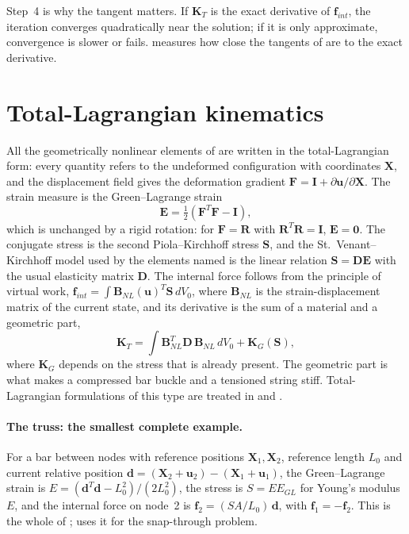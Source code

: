 
Step~4 is why the tangent matters. If $\bm K_T$ is the exact derivative of $\bm f_{int}$, the iteration converges quadratically near the solution; if it is only approximate, convergence is slower or fails.  measures how close the tangents of \fea{} are to the exact derivative.

\section{Total-Lagrangian kinematics}\label{sec:nl-tl}

All the geometrically nonlinear elements of \fea{} are written in the total-Lagrangian form: every quantity refers to the undeformed configuration with coordinates $\bm X$, and the displacement field gives the deformation gradient $\bm F=\bm I+\partial\bm u/\partial\bm X$. The strain measure is the Green--Lagrange strain
\begin{equation}\label{eq:nl-gl}
\bm E=\tfrac12\left(\bm F^{T}\bm F-\bm I\right),
\end{equation}
which is unchanged by a rigid rotation: for $\bm F=\bm R$ with $\bm R^T\bm R=\bm I$, $\bm E=\bm 0$. The conjugate stress is the second Piola--Kirchhoff stress $\bm S$, and the St.~Venant--Kirchhoff model used by the elements named  is the linear relation $\bm S=\bm D\bm E$ with the usual elasticity matrix $\bm D$. The internal force follows from the principle of virtual work, $\bm f_{int}=\int \bm B_{NL}(\bm u)^{T}\bm S\,dV_0$, where $\bm B_{NL}$ is the strain-displacement matrix of the current state, and its derivative is the sum of a material and a geometric part,
\begin{equation}\label{eq:nl-tangent}
\bm K_T=\int \bm B_{NL}^{T}\bm D\,\bm B_{NL}\,dV_0+\bm K_G(\bm S),
\end{equation}
where $\bm K_G$ depends on the stress that is already present. The geometric part is what makes a compressed bar buckle and a tensioned string stiff. Total-Lagrangian formulations of this type are treated in \citet{crisfield1981} and \citet{bathe2014fep}.

\paragraph{The truss: the smallest complete example.}
For a bar between nodes with reference positions $\bm X_1,\bm X_2$, reference length $L_0$ and current relative position $\bm d=(\bm X_2+\bm u_2)-(\bm X_1+\bm u_1)$, the Green--Lagrange strain is $E=(\bm d^T\bm d-L_0^2)/(2L_0^2)$, the stress is $S=EE_{GL}$ for Young's modulus $E$, and the internal force on node~2 is $\bm f_2=(SA/L_0)\,\bm d$, with $\bm f_1=-\bm f_2$. This is the whole of ;  uses it for the snap-through problem.

